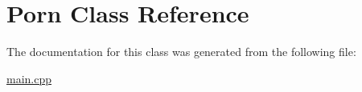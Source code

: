 \hypertarget{classPorn}{}\section{Porn Class Reference}
\label{classPorn}


The documentation for this class was generated from the following file\+:\begin{DoxyCompactItemize}
\item 
\hyperlink{main_8cpp}{main.\+cpp}\end{DoxyCompactItemize}
